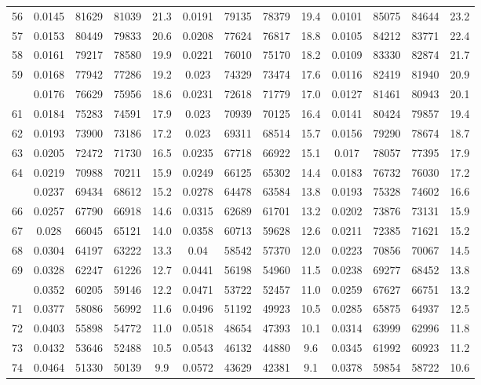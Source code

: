 \documentclass[
  14pt,
]{article}
\begin{document}
\begin{longtable}[t]{lcccccccccccc}
56 & 0.0145 & 81629 & 81039 & 21.3 & 0.0191 & 79135 & 78379 & 19.4 & 0.0101 & 85075 & 84644 & 23.2\\
57 & 0.0153 & 80449 & 79833 & 20.6 & 0.0208 & 77624 & 76817 & 18.8 & 0.0105 & 84212 & 83771 & 22.4\\
58 & 0.0161 & 79217 & 78580 & 19.9 & 0.0221 & 76010 & 75170 & 18.2 & 0.0109 & 83330 & 82874 & 21.7\\
59 & 0.0168 & 77942 & 77286 & 19.2 & 0.023 & 74329 & 73474 & 17.6 & 0.0116 & 82419 & 81940 & 20.9\\
\addlinespace
60 & 0.0176 & 76629 & 75956 & 18.6 & 0.0231 & 72618 & 71779 & 17.0 & 0.0127 & 81461 & 80943 & 20.1\\
61 & 0.0184 & 75283 & 74591 & 17.9 & 0.023 & 70939 & 70125 & 16.4 & 0.0141 & 80424 & 79857 & 19.4\\
62 & 0.0193 & 73900 & 73186 & 17.2 & 0.023 & 69311 & 68514 & 15.7 & 0.0156 & 79290 & 78674 & 18.7\\
63 & 0.0205 & 72472 & 71730 & 16.5 & 0.0235 & 67718 & 66922 & 15.1 & 0.017 & 78057 & 77395 & 17.9\\
64 & 0.0219 & 70988 & 70211 & 15.9 & 0.0249 & 66125 & 65302 & 14.4 & 0.0183 & 76732 & 76030 & 17.2\\
\addlinespace
65 & 0.0237 & 69434 & 68612 & 15.2 & 0.0278 & 64478 & 63584 & 13.8 & 0.0193 & 75328 & 74602 & 16.6\\
66 & 0.0257 & 67790 & 66918 & 14.6 & 0.0315 & 62689 & 61701 & 13.2 & 0.0202 & 73876 & 73131 & 15.9\\
67 & 0.028 & 66045 & 65121 & 14.0 & 0.0358 & 60713 & 59628 & 12.6 & 0.0211 & 72385 & 71621 & 15.2\\
68 & 0.0304 & 64197 & 63222 & 13.3 & 0.04 & 58542 & 57370 & 12.0 & 0.0223 & 70856 & 70067 & 14.5\\
69 & 0.0328 & 62247 & 61226 & 12.7 & 0.0441 & 56198 & 54960 & 11.5 & 0.0238 & 69277 & 68452 & 13.8\\
\addlinespace
70 & 0.0352 & 60205 & 59146 & 12.2 & 0.0471 & 53722 & 52457 & 11.0 & 0.0259 & 67627 & 66751 & 13.2\\
71 & 0.0377 & 58086 & 56992 & 11.6 & 0.0496 & 51192 & 49923 & 10.5 & 0.0285 & 65875 & 64937 & 12.5\\
72 & 0.0403 & 55898 & 54772 & 11.0 & 0.0518 & 48654 & 47393 & 10.1 & 0.0314 & 63999 & 62996 & 11.8\\
73 & 0.0432 & 53646 & 52488 & 10.5 & 0.0543 & 46132 & 44880 & 9.6 & 0.0345 & 61992 & 60923 & 11.2\\
74 & 0.0464 & 51330 & 50139 & 9.9 & 0.0572 & 43629 & 42381 & 9.1 & 0.0378 & 59854 & 58722 & 10.6\\

\end{longtable}
\end{document}
